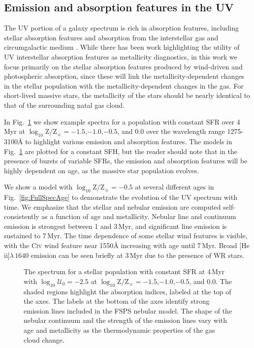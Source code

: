 \documentclass[preprint2]{aastex61}
\newcommand{\FSPS}{{\sc FSPS}\xspace}
\newcommand{\heii}{[He\,{\sc ii}]\xspace}
\newcommand{\Myr}{$\,$Myr\xspace}
\newcommand{\logten}{\ensuremath{\log_{10}}}
\newcommand{\logZeq}[1]{\ensuremath{\logten \mathrm{Z}/\mathrm{Z}_{\sun} = #1}}
\newcommand{\ang}{\ensuremath{\mbox{\AA}}\xspace}
\newcommand{\logUeq}[1]{\ensuremath{\logten \mathcal{U}_0 = #1}}
\begin{document}
\subsection{Emission and absorption features in the UV} \label{sec:mod:spec}

The UV portion of a galaxy spectrum is rich in absorption features, including stellar absorption features and absorption from the interstellar gas and circumgalactic medium \citep{Leitherer+2011}. While there has been work highlighting the utility of UV interstellar absorption features \citep[e.g.,][]{Rix+2004} as metallicity diagnostics, in this work we focus primarily on the stellar absorption features produced by wind-driven and photospheric absorption, since these will link the metallicity-dependent changes in the stellar population with the metallicity-dependent changes in the gas. For short-lived massive stars, the metallicity of the stars should be nearly identical to that of the surrounding natal gas cloud.

In Fig.~\ref{fig:FullSpec} we show example spectra for a population with constant SFR over 4\Myr at \logZeq{-1.5},$-1.0$,$-0.5$, and $0.0$ over the wavelength range 1275-3100\ang to highlight various emission and absorption features. The models in Fig.~\ref{fig:FullSpec} are plotted for a constant SFH, but the reader should note that in the presence of bursts of variable SFRs, the emission and absorption features will be highly dependent on age, as the massive star population evolves.

We show a model with \logZeq{-0.5} at several different ages in Fig.~\ref{fig:FullSpecAge} to demonstrate the evolution of the UV spectrum with time. We emphasize that the stellar and nebular emission are computed self-consistently as a function of age and metallicity. Nebular line and continuum emission is strongest between 1 and 3\Myr, and significant line emission is sustained to 7\Myr. The time dependence of some stellar wind features is visible, with the C\textsc{iv} wind feature near 1550\ang increasing with age until 7\Myr. Broad \heii$\lambda\,1640$ emission can be seen briefly at 3\Myr due to the presence of WR stars.

\begin{figure}
  \begin{center}
    \caption{The spectrum for a stellar population with constant SFR at 4\Myr with \logUeq{-2.5} at \logZeq{-1.5},$-1.0$,$-0.5$, and $0.0$. The shaded regions highlight the \citet{Leitherer+2011} absorption indices, labeled at the top of the axes. The labels at the bottom of the axes identify strong emission lines included in the \FSPS nebular model. The shape of the nebular continuum and the strength of the emission lines vary with age and metallicity as the thermodynamic properties of the gas cloud change.}
    \label{fig:FullSpec}
  \end{center}
\end{figure}
\end{document}
